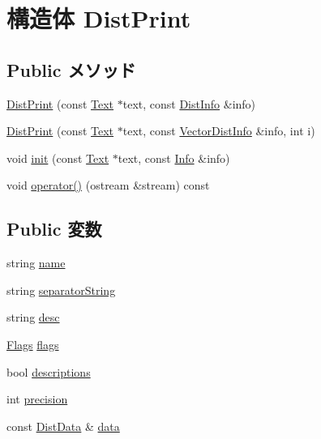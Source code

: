 \hypertarget{structStats_1_1DistPrint}{
\section{構造体 DistPrint}
\label{structStats_1_1DistPrint}
}
\subsection*{Public メソッド}
\begin{DoxyCompactItemize}
\item 
\hyperlink{structStats_1_1DistPrint_a33e2dab8b71e7ee9e2872688d12abc35}{DistPrint} (const \hyperlink{classStats_1_1Text}{Text} $\ast$text, const \hyperlink{classStats_1_1DistInfo}{DistInfo} \&info)
\item 
\hyperlink{structStats_1_1DistPrint_a81b7fc26776fe520382bac4ae466fff7}{DistPrint} (const \hyperlink{classStats_1_1Text}{Text} $\ast$text, const \hyperlink{classStats_1_1VectorDistInfo}{VectorDistInfo} \&info, int i)
\item 
void \hyperlink{structStats_1_1DistPrint_a5c205569f811ccef04fc7ddaf47e3add}{init} (const \hyperlink{classStats_1_1Text}{Text} $\ast$text, const \hyperlink{classStats_1_1Info}{Info} \&info)
\item 
void \hyperlink{structStats_1_1DistPrint_ab796867ec17c9aaf14b8e44923fc17e4}{operator()} (ostream \&stream) const 
\end{DoxyCompactItemize}
\subsection*{Public 変数}
\begin{DoxyCompactItemize}
\item 
string \hyperlink{structStats_1_1DistPrint_a8ccf841cb59e451791bcb2e1ac4f1edc}{name}
\item 
string \hyperlink{structStats_1_1DistPrint_ae18f266d1f96dc3dc8b179e00cf6c6f1}{separatorString}
\item 
string \hyperlink{structStats_1_1DistPrint_acc6fde76f2c440ef4a9f7dc3765038b5}{desc}
\item 
\hyperlink{classFlags}{Flags} \hyperlink{structStats_1_1DistPrint_aa991e2b209ef26272bf4fd920777bcda}{flags}
\item 
bool \hyperlink{structStats_1_1DistPrint_ada0eec8923acca0939a06f40c6a88af8}{descriptions}
\item 
int \hyperlink{structStats_1_1DistPrint_aa95455ed52a8459fad69509a4a0411b5}{precision}
\item 
const \hyperlink{structStats_1_1DistData}{DistData} \& \hyperlink{structStats_1_1DistPrint_a932b83b9304b5d7462c8e272bc4a9f54}{data}
\end{DoxyCompactItemize}


